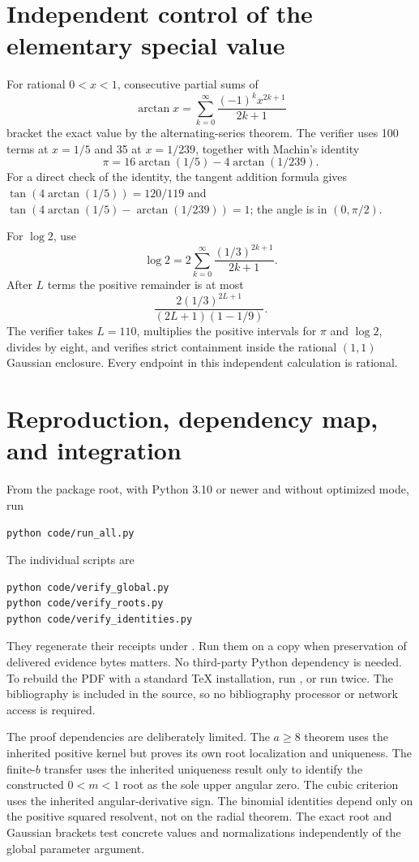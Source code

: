 \documentclass[11pt,letterpaper]{article}
\numberwithin{equation}{section}
\theoremstyle{definition}
\theoremstyle{remark}
\begin{document}
\section{Independent control of the elementary special value}
\label{app:control}
For rational $0<x<1$, consecutive partial sums of
\[
 \arctan x=\sum_{k=0}^\infty\frac{(-1)^kx^{2k+1}}{2k+1}
\]
bracket the exact value by the alternating-series theorem.
The verifier uses 100 terms at $x=1/5$ and 35 at $x=1/239$, together
with Machin's identity
\[
 \pi=16\arctan(1/5)-4\arctan(1/239).
\]
For a direct check of the identity, the tangent addition formula gives
$\tan(4\arctan(1/5))=120/119$ and
$\tan(4\arctan(1/5)-\arctan(1/239))=1$; the angle is in $(0,\pi/2)$.

For $\log2$, use
\[
 \log2=2\sum_{k=0}^\infty\frac{(1/3)^{2k+1}}{2k+1}.
\]
After $L$ terms the positive remainder is at most
\[
 \frac{2(1/3)^{2L+1}}{(2L+1)(1-1/9)}.
\]
The verifier takes $L=110$, multiplies the positive intervals for
$\pi$ and $\log2$, divides by eight, and verifies strict containment
inside the rational $(1,1)$ Gaussian enclosure. Every endpoint in
this independent calculation is rational.

\section{Reproduction, dependency map, and integration}
\label{app:reproduce}
From the package root, with Python 3.10 or newer and without optimized
mode, run
\begin{verbatim}
python code/run_all.py
\end{verbatim}
The individual scripts are
\begin{verbatim}
python code/verify_global.py
python code/verify_roots.py
python code/verify_identities.py
\end{verbatim}
They regenerate their receipts under . Run them on a copy
when preservation of delivered evidence bytes matters. No third-party
Python dependency is needed. To rebuild the PDF with a standard TeX
installation, run , or run 
twice. The bibliography is included in the source, so no bibliography
processor or network access is required.

The proof dependencies are deliberately limited. The $a\ge8$ theorem
uses the inherited positive kernel but proves its own root localization
and uniqueness. The finite-$b$ transfer uses the inherited uniqueness
result only to identify the constructed $0<m<1$ root as the sole upper
angular zero. The cubic criterion uses the inherited angular-derivative
sign. The binomial identities depend only on the positive squared
resolvent, not on the radial theorem. The exact root and Gaussian
brackets test concrete values and normalizations independently of
the global parameter argument.
\end{document}
